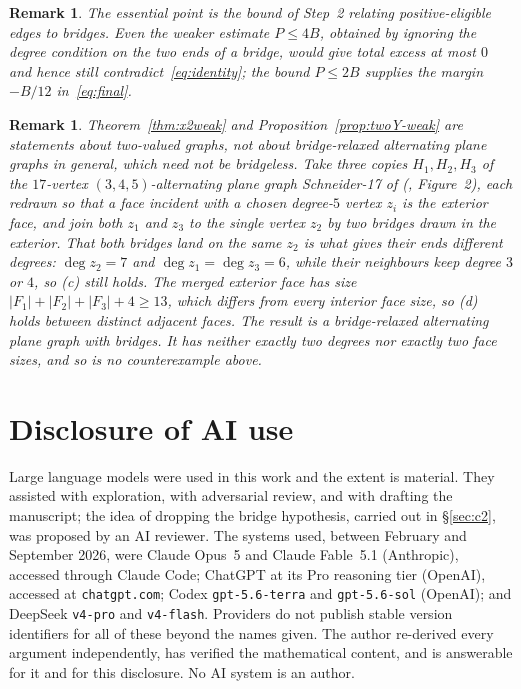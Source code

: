 \documentclass{baustms}
\theoremstyle{cupthm}
\theoremstyle{cupdefn}
\theoremstyle{cuprem}
\newtheorem{remark}[theorem]{Remark}
\begin{document}
\begin{remark}
The essential point is the bound of Step~2 relating positive-eligible edges to
bridges. Even the weaker estimate $P \le 4B$, obtained by ignoring the degree
condition on the two ends of a bridge, would give total excess at most $0$ and
hence still contradict~\eqref{eq:identity}; the bound $P \le 2B$ supplies the
margin $-B/12$ in~\eqref{eq:final}.
\end{remark}

\begin{remark}\label{rem:bridged}
Theorem~\ref{thm:x2weak} and Proposition~\ref{prop:twoY-weak} are statements
about two-valued graphs, not about bridge-relaxed alternating plane graphs in
general, which need not be bridgeless. Take three copies $H_1,H_2,H_3$ of the
$17$-vertex $(3,4,5)$-alternating plane graph Schneider-17 of
(\cite{AHSSV2015}, Figure~2), each redrawn so that a face incident with a chosen
degree-$5$ vertex $z_i$ is the exterior face, and join both $z_1$ and $z_3$ to
the \emph{single} vertex $z_2$ by two bridges drawn in the exterior. That both
bridges land on the same $z_2$ is what gives their ends different degrees:
$\deg z_2 = 7$ and
$\deg z_1 = \deg z_3 = 6$, while their neighbours keep degree $3$ or $4$, so
(c) still holds. The merged exterior face has size
$|F_1|+|F_2|+|F_3|+4 \ge 13$, which differs from every interior face size, so (d)
holds between distinct adjacent faces. The result is a bridge-relaxed
alternating plane graph with bridges. It has neither exactly two degrees nor
exactly two face sizes, and so is no counterexample above.
\end{remark}

\section*{Disclosure of AI use}

Large language models were used in this work and the extent is material. They
assisted with exploration, with adversarial review, and with drafting the
manuscript; the idea of dropping the bridge hypothesis, carried out in
\S\ref{sec:c2}, was proposed by an AI reviewer. The systems used, between
February and September 2026, were Claude Opus~5 and Claude Fable~5.1
(Anthropic), accessed through Claude Code; ChatGPT at its Pro reasoning tier
(OpenAI), accessed at \texttt{chatgpt.com}; Codex \texttt{gpt-5.6-terra} and
\texttt{gpt-5.6-sol} (OpenAI); and DeepSeek \texttt{v4-pro} and
\texttt{v4-flash}. Providers do not publish stable version identifiers for all
of these beyond the names given. The author re-derived every argument
independently, has verified the mathematical content, and is answerable for it
and for this disclosure. No AI system is an author.
\end{document}
